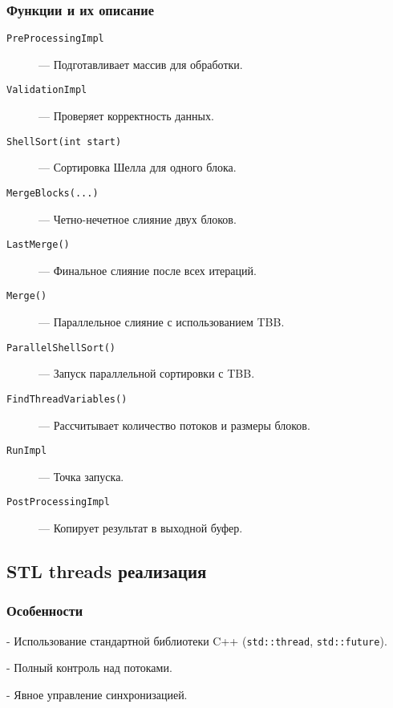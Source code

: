 \documentclass[12pt]{article}
\begin{document}
\subsubsection*{Функции и их описание}
\begin{description}
    \item[\texttt{PreProcessingImpl}] — Подготавливает массив для обработки.
    \item[\texttt{ValidationImpl}] — Проверяет корректность данных.
    \item[\texttt{ShellSort(int start)}] — Сортировка Шелла для одного блока.
    \item[\texttt{MergeBlocks(...)}] — Четно-нечетное слияние двух блоков.
    \item[\texttt{LastMerge()}] — Финальное слияние после всех итераций.
    \item[\texttt{Merge()}] — Параллельное слияние с использованием TBB.
    \item[\texttt{ParallelShellSort()}] — Запуск параллельной сортировки с TBB.
    \item[\texttt{FindThreadVariables()}] — Рассчитывает количество потоков и размеры блоков.
    \item[\texttt{RunImpl}] — Точка запуска.
    \item[\texttt{PostProcessingImpl}] — Копирует результат в выходной буфер.
\end{description}

\subsection{STL threads реализация}
\subsubsection*{Особенности}

    
- Использование стандартной библиотеки C++ (\texttt{std::thread}, \texttt{std::future}).
    
- Полный контроль над потоками.
    
- Явное управление синхронизацией.
\end{document}

